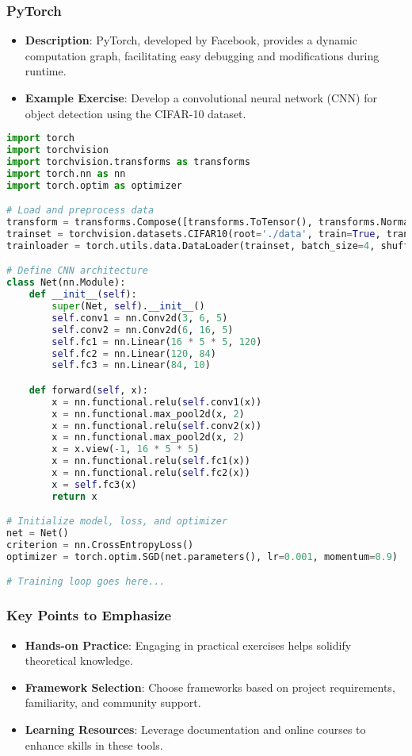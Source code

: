 \documentclass{beamer}
\begin{document}
\begin{frame}[fragile]
    \frametitle{PyTorch}
    \begin{itemize}
        \item \textbf{Description}: PyTorch, developed by Facebook, provides a dynamic computation graph, facilitating easy debugging and modifications during runtime.
        \item \textbf{Example Exercise}: Develop a convolutional neural network (CNN) for object detection using the CIFAR-10 dataset.
    \end{itemize}
    \begin{lstlisting}[language=Python, caption=PyTorch Code Snippet]
import torch
import torchvision
import torchvision.transforms as transforms
import torch.nn as nn
import torch.optim as optimizer

# Load and preprocess data
transform = transforms.Compose([transforms.ToTensor(), transforms.Normalize((0.5, 0.5, 0.5), (0.5, 0.5, 0.5))])
trainset = torchvision.datasets.CIFAR10(root='./data', train=True, transform=transform, download=True)
trainloader = torch.utils.data.DataLoader(trainset, batch_size=4, shuffle=True, num_workers=2)

# Define CNN architecture
class Net(nn.Module):
    def __init__(self):
        super(Net, self).__init__()
        self.conv1 = nn.Conv2d(3, 6, 5)
        self.conv2 = nn.Conv2d(6, 16, 5)
        self.fc1 = nn.Linear(16 * 5 * 5, 120)
        self.fc2 = nn.Linear(120, 84)
        self.fc3 = nn.Linear(84, 10)

    def forward(self, x):
        x = nn.functional.relu(self.conv1(x))
        x = nn.functional.max_pool2d(x, 2)
        x = nn.functional.relu(self.conv2(x))
        x = nn.functional.max_pool2d(x, 2)
        x = x.view(-1, 16 * 5 * 5)
        x = nn.functional.relu(self.fc1(x))
        x = nn.functional.relu(self.fc2(x))
        x = self.fc3(x)
        return x

# Initialize model, loss, and optimizer
net = Net()
criterion = nn.CrossEntropyLoss()
optimizer = torch.optim.SGD(net.parameters(), lr=0.001, momentum=0.9)

# Training loop goes here...
    \end{lstlisting}
\end{frame}

\begin{frame}
    \frametitle{Key Points to Emphasize}
    \begin{itemize}
        \item \textbf{Hands-on Practice}: Engaging in practical exercises helps solidify theoretical knowledge.
        \item \textbf{Framework Selection}: Choose frameworks based on project requirements, familiarity, and community support.
        \item \textbf{Learning Resources}: Leverage documentation and online courses to enhance skills in these tools.
    \end{itemize}
\end{frame}
\end{document}
